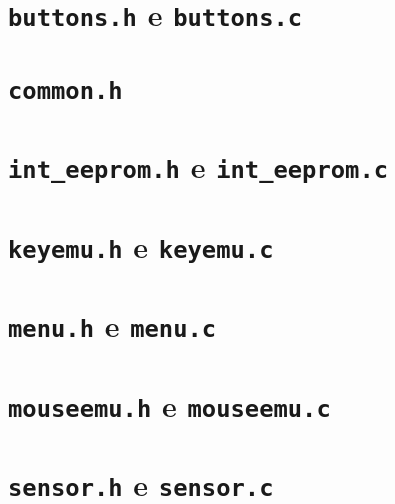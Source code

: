 \documentclass[brazil,pagestart=firstchapter]{abnt}
\begin{document}
\chapter{\texttt{buttons.h} e \texttt{buttons.c}}
\label{ape:buttons}

\clearpage


\chapter{\texttt{common.h}}
\label{ape:common}


\chapter{\texttt{int\_eeprom.h} e \texttt{int\_eeprom.c}}
\label{ape:int_eeprom}

\clearpage


\chapter{\texttt{keyemu.h} e \texttt{keyemu.c}}
\label{ape:keyemu}

\clearpage


\chapter{\texttt{menu.h} e \texttt{menu.c}}
\label{ape:menu}

\clearpage


\chapter{\texttt{mouseemu.h} e \texttt{mouseemu.c}}
\label{ape:mouseemu}

\clearpage


\chapter{\texttt{sensor.h} e \texttt{sensor.c}}
\label{ape:sensor}

\clearpage

\end{document}
